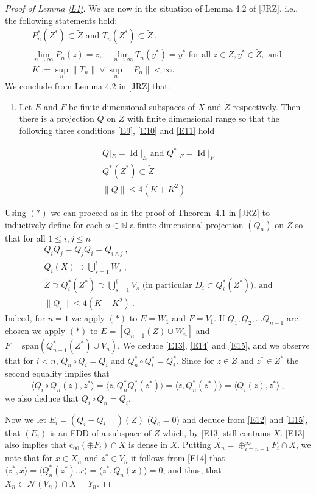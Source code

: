 \documentclass[11pt,leqno]{amsart}
\theoremstyle{definition}
\newcommand{\coo}{\mbox{c}_{00}}
\newcommand{\Id}{\operatorname{Id}}
\newcommand{\cN}{\mathcal{N}}
\newcommand{\N}{\mathbb{N}}
\begin{document}
\begin{proof}[Proof of Lemma \ref{L1}]
We are now in the situation of Lemma 4.2 of [JRZ], i.e., the
following statements hold:
\begin{gather}
P_n^*(Z^*)\subset \tilde Z\text{ and }T_n(Z^*)\subset \tilde Z\ ,\label{E6}\\
\lim_{n\to\infty} P_n(z)=z,\quad\lim_{n\to\infty} T_n(y^*)=y^*
\text{ for all }z\in Z, y^*\in \tilde Z,\text{ and }\label{E7}\\
K:=\sup_n\|T_n\|\vee\sup_n\|P_n\|<\infty.\label{E8}
\end{gather}
We conclude from Lemma 4.2 in [JRZ] that:
\begin{enumerate}
\item[$(*)$] 
Let $E$ and $F$ be finite dimensional 
subspaces of $X$ and $\tilde Z$ respectively.
Then there is a projection $Q$ on $Z$ 
with finite dimensional range  so that  
the following three conditions \eqref{E9}, \eqref{E10} and \eqref{E11} hold
\end{enumerate}
\begin{gather}
Q|_E=\Id|_E\text{ and }Q^*|_F=\Id|_F\label{E9}\\
Q^*(Z^*)\subset \tilde Z\label{E10}\\
\|Q\|\le 4(K+K^2)\label{E11}
\end{gather}
  
Using $(*)$  we can proceed as in the proof of
Theorem~4.1 in [JRZ] to inductively define for each $n\in\N$
a finite dimensional projection
$(Q_n)$ on $Z$ so that for all $1\le i,j\le n$ 
\begin{gather}
Q_iQ_j=Q_jQ_i=Q_{i\wedge j}\ ,\label{E12}\\
Q_i(X)\supset\bigcup_{s=1}^i W_s\ ,\label{E13}\\
\tilde Z\supset Q_i^*(Z^*)\supset\bigcup_{s=1}^i V_s
\text{ (in particular $D_i\subset Q^*_i(Z^*)$), and}\label{E14}\\ 
\|Q_i\|\le 4(K+K^2)\ .\label{E15}
\end{gather}
Indeed, for $n=1$ we apply $(*)$ to $E=W_1$ and $F=V_1$. 
If $Q_1,Q_2,\ldots Q_{n-1}$ are
chosen we apply $(*)$ to $E=[Q_{n-1}(Z)\cup W_n]$ and 
$F=\text{span}(Q_{n-1}^*(Z^*)\cup V_n)$.
We deduce \eqref{E13}, \eqref{E14} and \eqref{E15}, and we observe that
for $i<n$, $Q_n\circ Q_i=Q_i$ and $Q_n^*\circ Q_i^*=Q_i^*$.
Since for $z\in Z$ and $z^*\in Z^*$ the second equality implies that
$$\langle Q_i\circ Q_n(z),z^*\rangle
=\langle z,Q_n^*Q_i^*(z^*)\rangle 
=\langle z,Q_n^*(z^*)\rangle 
=\langle Q_i(z),z^*\rangle\ ,$$
we also deduce that $Q_i\circ Q_n=Q_i$.

Now we let $E_i=(Q_i-Q_{i-1})(Z)$ ($Q_0=0$) and deduce from 
\eqref{E12} and \eqref{E15}, that $(E_i)$ is an
FDD of a subspace of $Z$ which, by \eqref{E13} still contains $X$. 
\eqref{E13} also implies that $\coo(\oplus F_i)\cap X$ is dense in $X$. 
Putting $X_n=\oplus_{i=n+1}^\infty F_i\cap X$,
we note that for $x\in X_n$ and $z^*\in V_n$ it follows from \eqref{E14} that 
$\langle z^*,x\rangle = \langle Q_n^*(z^*),x\rangle 
=\langle z^*,Q_n(x)\rangle=0$, and thus, that $X_n\subset\cN(V_n)\cap X=Y_n$.
 

\end{proof}
\end{document}
